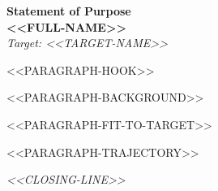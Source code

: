 \documentclass[11pt,a4paper]{article}
\begin{document}
\begin{center}
  {\Large\bfseries Statement of Purpose}\\[3pt]
  {\color{accent}\bfseries <<FULL-NAME>>}\\[2pt]
  \textit{Target: <<TARGET-NAME>>}  %
\end{center}
\vspace{6pt}


<<PARAGRAPH-HOOK>>

<<PARAGRAPH-BACKGROUND>>

<<PARAGRAPH-FIT-TO-TARGET>>

<<PARAGRAPH-TRAJECTORY>>

\vspace{8pt}
\noindent \textit{<<CLOSING-LINE>>}
\end{document}

